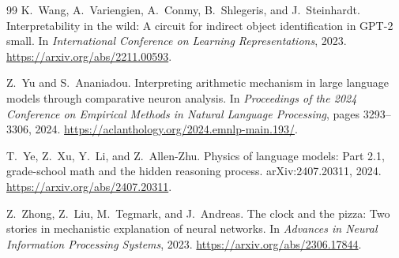 \documentclass[11pt]{article}
\begin{document}
\begin{thebibliography}{99}
K.~Wang, A.~Variengien, A.~Conmy, B.~Shlegeris, and J.~Steinhardt.
\newblock Interpretability in the wild: A circuit for indirect object identification in GPT-2 small.
\newblock In \emph{International Conference on Learning Representations}, 2023.
\newblock \url{https://arxiv.org/abs/2211.00593}.

Z.~Yu and S.~Ananiadou.
\newblock Interpreting arithmetic mechanism in large language models through comparative neuron analysis.
\newblock In \emph{Proceedings of the 2024 Conference on Empirical Methods in Natural Language Processing}, pages 3293--3306, 2024.
\newblock \url{https://aclanthology.org/2024.emnlp-main.193/}.

T.~Ye, Z.~Xu, Y.~Li, and Z.~Allen-Zhu.
\newblock Physics of language models: Part 2.1, grade-school math and the hidden reasoning process.
\newblock arXiv:2407.20311, 2024.
\newblock \url{https://arxiv.org/abs/2407.20311}.

Z.~Zhong, Z.~Liu, M.~Tegmark, and J.~Andreas.
\newblock The clock and the pizza: Two stories in mechanistic explanation of neural networks.
\newblock In \emph{Advances in Neural Information Processing Systems}, 2023.
\newblock \url{https://arxiv.org/abs/2306.17844}.

\end{thebibliography}
\end{document}

